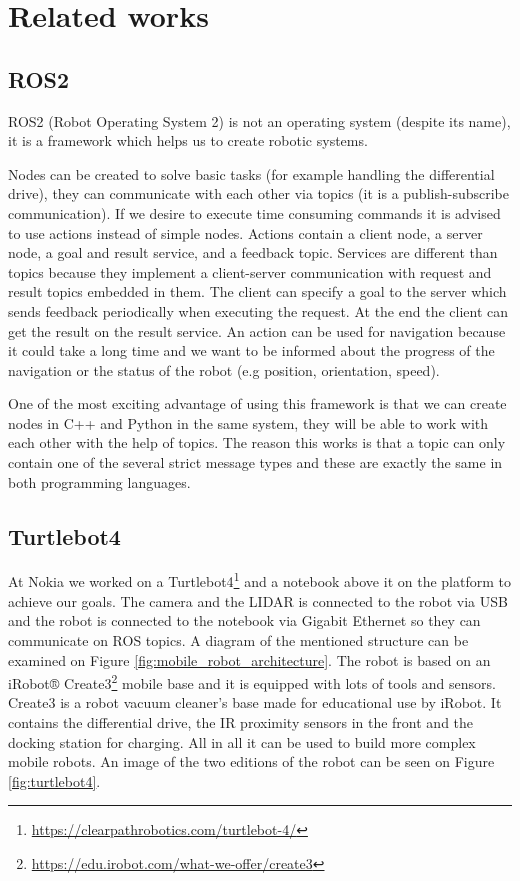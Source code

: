 \chapter{Related works} \label{related_works}

\section{ROS2}

ROS2\cite{ROS2} (Robot Operating System 2) is not an operating system (despite its name), it is a framework which helps us to create robotic systems.

Nodes can be created to solve basic tasks (for example handling the differential drive), they can communicate with each other via topics (it is a publish-subscribe communication). If we desire to execute time consuming commands it is advised to use actions instead of simple nodes. Actions contain a client node, a server node, a goal and result service, and a feedback topic. Services are different than topics because they implement a client-server communication with request and result topics embedded in them. The client can specify a goal to the server which sends feedback periodically when executing the request. At the end the client can get the result on the result service. An action can be used for navigation because it could take a long time and we want to be informed about the progress of the navigation or the status of the robot (e.g position, orientation, speed). 

One of the most exciting advantage of using this framework is that we can create nodes in C++ and Python in the same system, they will be able to work with each other with the help of topics. The reason this works is that a topic can only contain one of the several strict message types and these are exactly the same in both programming languages.

\section{Turtlebot4}

At Nokia we worked on a Turtlebot4\footnote{\url{https://clearpathrobotics.com/turtlebot-4/}} and a notebook above it on the platform to achieve our goals. The camera and the LIDAR is connected to the robot via USB and the robot is connected to the notebook via Gigabit Ethernet so they can communicate on ROS topics. A diagram of the mentioned structure can be examined on Figure \ref{fig:mobile_robot_architecture}. The robot is based on an iRobot® Create3\footnote{\url{https://edu.irobot.com/what-we-offer/create3}} mobile base and it is equipped with lots of tools and sensors. Create3 is a robot vacuum cleaner's base made for educational use by iRobot. It contains the differential drive, the IR proximity sensors in the front and the docking station for charging. All in all it can be used to build more complex mobile robots. An image of the two editions of the robot can be seen on Figure \ref{fig:turtlebot4}.

